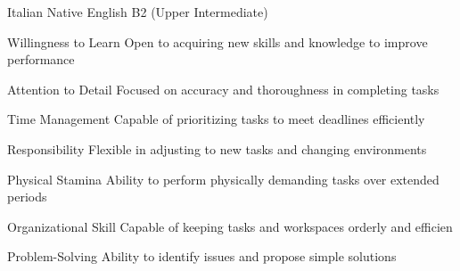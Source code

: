 


\begin{cvskills}
  \cvskill
    {Italian} %
    {Native} %
  \cvskill
    {English} %
    {B2 (Upper Intermediate)} %
\end{cvskills}


\begin{cvskills}
  \cvskill
    {Willingness to Learn} %
    {Open to acquiring new skills and knowledge to improve performance} %
    
  \cvskill
    {Attention to Detail} %
    {Focused on accuracy and thoroughness in completing tasks} %
    
  \cvskill
    {Time Management} %
    {Capable of prioritizing tasks to meet deadlines efficiently} %

  \cvskill
    {Responsibility} %
    {Flexible in adjusting to new tasks and changing environments} %

  \cvskill
    {Physical Stamina} %
    {Ability to perform physically demanding tasks over extended periods} %

\cvskill
    {Organizational Skill} %
    {Capable of keeping tasks and workspaces orderly and efficien} %

  \cvskill
    {Problem-Solving} %
    {Ability to identify issues and propose simple solutions} %

\end{cvskills}

